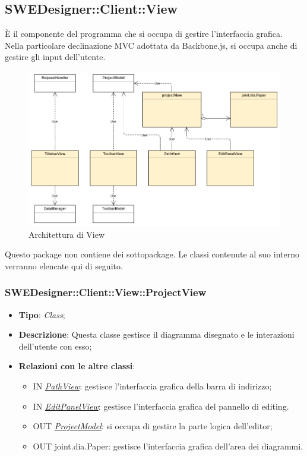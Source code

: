 \documentclass[../SpecificaTecnica.tex]{subfiles}
\begin{document}
			\subsection{SWEDesigner::Client::View}
				\hypertarget{SWEDesigner::Client::View}{}
				È il componente del programma che si occupa di gestire l'interfaccia grafica. Nella particolare declinazione MVC adottata da Backbone.js, si occupa anche di gestire gli input dell'utente.
					\begin{figure}[H]\label{fig:View}
						\centering
						\includegraphics[scale=0.44]{Immagini/DiagrammaArchitettura/View.png}
						\caption{Architettura di View}
					\end{figure}
				Questo package non contiene dei sottopackage.
				Le classi contenute al suo interno verranno elencate qui di seguito.

				\subsubsection{SWEDesigner::Client::View::ProjectView}
					\hypertarget{SWEDesigner::Client::View::ProjectView}{}
					\begin{itemize}
						\item \textbf{Tipo}: \emph{Class};
						\item \textbf{Descrizione}: Questa classe gestisce il diagramma disegnato e le interazioni dell'utente con esso;
						\item \textbf{Relazioni con le altre classi}:
						\begin{itemize}
							\item IN \hyperlink{SWEDesigner::View::PathView}{\emph{PathView}}: gestisce l'interfaccia grafica della barra di indirizzo;
							\item IN \hyperlink{SWEDesigner::View::EditPanelView}{\emph{EditPanelView}}: gestisce l'interfaccia grafica del pannello di editing.
							\item OUT \hyperlink{SWEDesigner::Model::ProjectModel}{\emph{ProjectModel}}: si occupa di gestire la parte logica dell'editor;
							\item OUT joint.dia.Paper: gestisce l'interfaccia grafica dell'area dei diagrammi.
						\end{itemize}
					\end{itemize}
					
\end{document}
